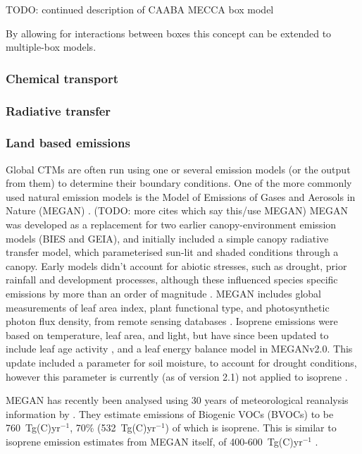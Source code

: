     TODO: continued description of CAABA MECCA box model
    
      By allowing for interactions between boxes this concept can be extended to multiple-box models.
    \subsubsection{Chemical transport} %
    \subsubsection{Radiative transfer} %
    \subsubsection{Land based emissions} %
      
      Global CTMs are often run using one or several emission models (or the output from them) to determine their boundary conditions.
      One of the more commonly used natural emission models is the Model of Emissions of Gases and Aerosols in Nature (MEGAN) \citep{Monks2015}. (TODO: more cites which say this/use MEGAN)
      MEGAN was developed as a replacement for two earlier canopy-environment emission models (BIES and GEIA), and initially included a simple canopy radiative transfer model, which parameterised sun-lit and shaded conditions through a canopy.
    Early models didn't account for abiotic stresses, such as drought, prior rainfall and development processes, although these influenced species specific emissions by more than an order of magnitude \citep{Niinemets1999}.
    MEGAN includes global measurements of leaf area index, plant functional type, and photosynthetic photon flux density, from remote sensing databases \citep{Kefauver2014}.
    Isoprene emissions were based on temperature, leaf area, and light, but have since been updated to include leaf age activity \citep{Guenther2000}, and a leaf energy balance model \citep{Guenther2006} in MEGANv2.0.
    This update included a parameter for soil moisture, to account for drought conditions, however this parameter is currently (as of version 2.1) not applied to isoprene \citep{Sindelarova2014}.
    
    MEGAN has recently been analysed using 30 years of meteorological reanalysis information by \citet{Sindelarova2014}.
    They estimate emissions of Biogenic VOCs (BVOCs) to be 760~Tg(C)yr$^{-1}$, 70\% (532~Tg(C)yr$^{-1}$) of which is isoprene.
    This is similar to isoprene emission estimates from MEGAN itself, of 400-600~Tg(C)yr$^{-1}$ \citep{Guenther2006}.
    
